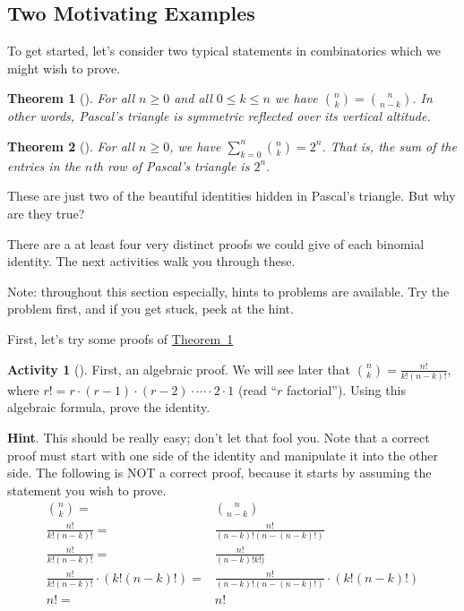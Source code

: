 \documentclass[10pt,]{book}
\theoremstyle{plain}
\newtheorem{theorem}{Theorem}[section]
\theoremstyle{definition}
\theoremstyle{definition}
\theoremstyle{definition}
\newtheorem{activity}[project]{Activity}
\numberwithin{equation}{chapter}
\newcommand{\amp}{&}
\begin{document}
\subsection[{Two Motivating Examples}]{Two Motivating Examples}\label{subsec-basic-proofs-examples}
\hypertarget{p-547}{}%
To get started, let's consider two typical statements in combinatorics which we might wish to prove.%
\begin{theorem}[{}]\label{thm-pascalsym}
\hypertarget{p-548}{}%
For all \(n \ge 0\) and all \(0 \le k \le n\) we have \(\binom{n}{k} = \binom{n}{n-k}\).  In other words, Pascal's triangle is symmetric reflected over its vertical altitude.%
\end{theorem}
\begin{theorem}[{}]\label{thm-pascalrowsum}
\hypertarget{p-549}{}%
For all \(n \ge 0\), we have \(\sum_{k=0}^n \binom{n}{k} = 2^n\).  That is, the sum of the entries in the \(n\)th row of Pascal's triangle is \(2^n\).%
\end{theorem}
\hypertarget{p-550}{}%
These are just two of the beautiful identities hidden in Pascal's triangle.  But why are they true?%
\par
\hypertarget{p-551}{}%
There are a at least four very distinct proofs we could give of each binomial identity.  The next activities walk you through these.%
\par
\hypertarget{p-552}{}%
Note: throughout this section especially, hints to problems are available.  Try the problem first, and if you get stuck, peek at the hint.%
\par
\hypertarget{p-553}{}%
First, let's try some proofs of \hyperref[thm-pascalsym]{Theorem~\ref{thm-pascalsym}}%
\begin{activity}[]\label{activity-65}
\hypertarget{p-554}{}%
First, an algebraic proof.  We will see later that \(\binom{n}{k} = \frac{n!}{k!(n-k)!}\), where \(r! = r \cdot (r-1) \cdot (r-2) \cdot\cdots\cdot 2\cdot 1\) (read ``\(r\) factorial'').  Using this algebraic formula, prove the identity.%
\par\smallskip%
\noindent\textbf{Hint}.\hypertarget{hint-27}{}\quad%
\hypertarget{p-555}{}%
This should be really easy; don't let that fool you.  Note that a correct proof must start with one side of the identity and manipulate it into the other side.  The following is NOT a correct proof, because it starts by assuming the statement you wish to prove.%
\begin{align*}
\binom{n}{k}  = \amp \binom{n}{n-k}\\
\frac{n!}{k!(n-k)!} =  \amp \frac{n!}{(n-k)!(n-(n-k)!)}\\
\frac{n!}{k!(n-k)!} =  \amp \frac{n!}{(n-k)!k!)}\\
\frac{n!}{k!(n-k)!} \cdot (k!(n-k)!)=  \amp \frac{n!}{(n-k)!(n-(n-k)!)}\cdot(k!(n-k)!)\\
n! =  \amp n!
\end{align*}
%
\end{activity}
\end{document}
